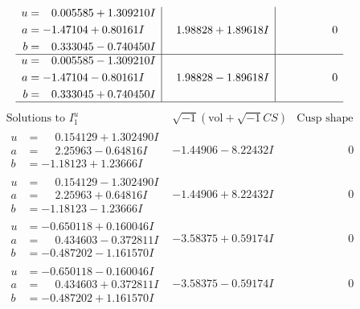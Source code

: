 \documentclass[1p]{elsarticle_modified}
\theoremstyle{definition}
\newcommand{\I}{\sqrt{-1}}
\begin{document}
$$\begin{array}{c|c|c}
\begin{aligned}
u &= \phantom{-}0.005585 + 1.309210 I \\
a &= -1.47104 + 0.80161 I \\
b &= \phantom{-}0.333045 - 0.740450 I\end{aligned}
 & \phantom{-}1.98828 + 1.89618 I & \phantom{-0.000000 } 0 \\ \hline\begin{aligned}
u &= \phantom{-}0.005585 - 1.309210 I \\
a &= -1.47104 - 0.80161 I \\
b &= \phantom{-}0.333045 + 0.740450 I\end{aligned}
 & \phantom{-}1.98828 - 1.89618 I & \phantom{-0.000000 } 0\\
 \hline 
 \end{array}$$\newpage$$\begin{array}{c|c|c}  
\text{Solutions to }I^u_{1}& \I (\text{vol} + \sqrt{-1}CS) & \text{Cusp shape}\\
 \hline 
\begin{aligned}
u &= \phantom{-}0.154129 + 1.302490 I \\
a &= \phantom{-}2.25963 - 0.64816 I \\
b &= -1.18123 + 1.23666 I\end{aligned}
 & -1.44906 - 8.22432 I & \phantom{-0.000000 } 0 \\ \hline\begin{aligned}
u &= \phantom{-}0.154129 - 1.302490 I \\
a &= \phantom{-}2.25963 + 0.64816 I \\
b &= -1.18123 - 1.23666 I\end{aligned}
 & -1.44906 + 8.22432 I & \phantom{-0.000000 } 0 \\ \hline\begin{aligned}
u &= -0.650118 + 0.160046 I \\
a &= \phantom{-}0.434603 - 0.372811 I \\
b &= -0.487202 - 1.161570 I\end{aligned}
 & -3.58375 + 0.59174 I & \phantom{-0.000000 } 0 \\ \hline\begin{aligned}
u &= -0.650118 - 0.160046 I \\
a &= \phantom{-}0.434603 + 0.372811 I \\
b &= -0.487202 + 1.161570 I\end{aligned}
 & -3.58375 - 0.59174 I & \phantom{-0.000000 } 0 \\ \hline\begin{aligned}

\end{aligned}
\end{array}$$
\end{document}
